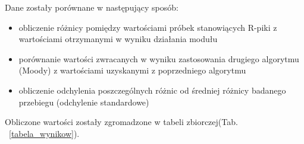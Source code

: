 	Dane zostały porównane w następujący sposób:
	\begin{itemize}
 	\item obliczenie różnicy pomiędzy wartościami próbek stanowiących R-piki z wartościami 					otrzymanymi w wyniku działania modułu
 	\item porównanie wartości zwracanych w wyniku zastosowania drugiego algorytmu (Moody) z 				wartościami uzyskanymi z poprzedniego algorytmu
  	\item obliczenie odchylenia poszczególnych różnic od średniej różnicy badanego przebiegu 				(odchylenie standardowe)
	\end{itemize}
	
	Obliczone wartości zostały zgromadzone w tabeli zbiorczej(Tab. ~\ref{tabela_wynikow}). \newline

